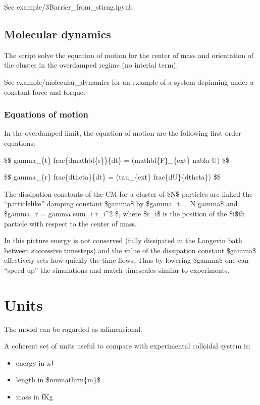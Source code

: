 \documentclass[letterpaper,10pt,english]{sphinxmanual}
\begin{document}
\sphinxAtStartPar
See example/3\sphinxhyphen{}Barrier\_from\_stirng.ipynb


\section{Molecular dynamics}
\label{\detokenize{index:molecular-dynamics}}
\sphinxAtStartPar
The script  solve the equation of motion for the center of mass and orientation of the cluster in the overdamped regime (no interial term).

\sphinxAtStartPar
See example/molecular\_dynamics for an example of a system depinning under a constant force and torque.


\subsection{Equations of motion}
\label{\detokenize{index:equations-of-motion}}
\sphinxAtStartPar
In the overdamped limit, the equation of motion are the following first order equations:

\sphinxAtStartPar
\$\$ gamma\_\{t\} frac\{dmathbf\{r\}\}\{dt\} = (mathbf\{F\}\_\{ext\} \sphinxhyphen{} nabla U) \$\$

\sphinxAtStartPar
\$\$ gamma\_\{r\} frac\{dtheta\}\{dt\} = (tau\_\{ext\} \sphinxhyphen{} frac\{dU\}\{dtheta\}) \$\$

\sphinxAtStartPar
The dissipation constants of the CM for a cluster of \$N\$ particles are linked the “particle\sphinxhyphen{}like” damping constant \$gamma\$ by
\$gamma\_t = N gamma\$
and
\$gamma\_r = gamma sum\_i r\_i\textasciicircum{}2 \$, where \$r\_i\$ is the position of the \$i\$\sphinxhyphen{}th particle with respect to the center of mass.

\sphinxAtStartPar
In this picture energy is not conserved (fully dissipated in the Langevin bath between successive timesteps) and the value of the dissipation constant \$gamma\$ effectively sets how quickly the time flows.
Thus by lowering \$gamma\$ one can “speed up” the simulations and match timescales similar to experiments.


\chapter{Units}
\label{\detokenize{index:units}}
\sphinxAtStartPar
The model can be ragarded as adimensional.

\sphinxAtStartPar
A coherent set of units useful to compare with experimental colloidal system is:
\begin{itemize}
\item {} 
\sphinxAtStartPar
energy in zJ

\item {} 
\sphinxAtStartPar
length in \$mumathrm\{m\}\$

\item {} 
\sphinxAtStartPar
mass in fKg

\end{itemize}
\end{document}

